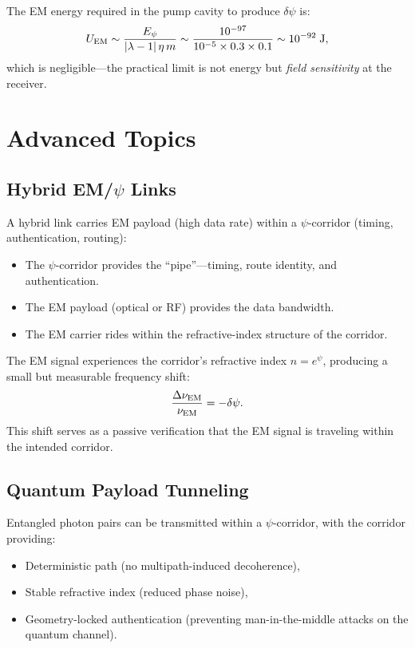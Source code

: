 \documentclass[twocolumn,superscriptaddress,prd,nofootinbib]{revtex4-2}
\begin{document}
The EM energy required in the pump cavity to produce $\delta\psi$ is:
\begin{equation}
U_{\rm EM} \sim \frac{E_\psi}{|\lambda - 1|\,\eta\,m} \sim
\frac{10^{-97}}{10^{-5} \times 0.3 \times 0.1} \sim 10^{-92}\;\text{J},
\label{eq:EM-energy}
\end{equation}
which is negligible---the practical limit is not energy but \emph{field
sensitivity} at the receiver.

\section{Advanced Topics}\label{sec:advanced}

\subsection{Hybrid EM/$\psi$ Links}

A hybrid link carries EM payload (high data rate) within a $\psi$-corridor
(timing, authentication, routing):
\begin{itemize}
\item The $\psi$-corridor provides the ``pipe''---timing, route identity,
and authentication.
\item The EM payload (optical or RF) provides the data bandwidth.
\item The EM carrier rides within the refractive-index structure of the
corridor.
\end{itemize}

The EM signal experiences the corridor's refractive index
$n = e^\psi$, producing a small but measurable frequency shift:
\begin{equation}
\frac{\Delta\nu_{\rm EM}}{\nu_{\rm EM}} = -\delta\psi.
\label{eq:EM-shift}
\end{equation}
This shift serves as a passive verification that the EM signal is
traveling within the intended corridor.

\subsection{Quantum Payload Tunneling}

Entangled photon pairs can be transmitted within a $\psi$-corridor,
with the corridor providing:
\begin{itemize}
\item Deterministic path (no multipath-induced decoherence),
\item Stable refractive index (reduced phase noise),
\item Geometry-locked authentication (preventing man-in-the-middle
attacks on the quantum channel).
\end{itemize}
\end{document}
